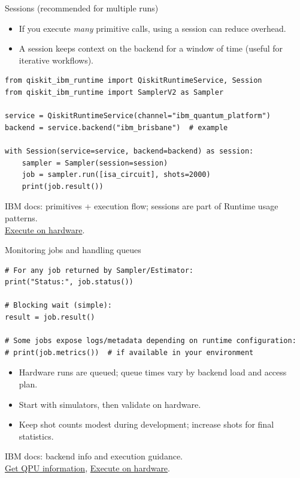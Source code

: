 \documentclass{beamer}
\begin{document}
\begin{frame}[fragile]{Sessions (recommended for multiple runs)}
\begin{itemize}
  \item If you execute \emph{many} primitive calls, using a session can reduce overhead.
  \item A session keeps context on the backend for a window of time (useful for iterative workflows).
\end{itemize}

\begin{lstlisting}
from qiskit_ibm_runtime import QiskitRuntimeService, Session
from qiskit_ibm_runtime import SamplerV2 as Sampler

service = QiskitRuntimeService(channel="ibm_quantum_platform")
backend = service.backend("ibm_brisbane")  # example

with Session(service=service, backend=backend) as session:
    sampler = Sampler(session=session)
    job = sampler.run([isa_circuit], shots=2000)
    print(job.result())
\end{lstlisting}

\vspace{0.2em}
\scriptsize
IBM docs: primitives + execution flow; sessions are part of Runtime usage patterns.\\
\href{https://quantum.cloud.ibm.com/docs/guides/execute-on-hardware}{Execute on hardware}.%
\end{frame}

\begin{frame}[fragile]{Monitoring jobs and handling queues}
\begin{lstlisting}
# For any job returned by Sampler/Estimator:
print("Status:", job.status())

# Blocking wait (simple):
result = job.result()

# Some jobs expose logs/metadata depending on runtime configuration:
# print(job.metrics())  # if available in your environment
\end{lstlisting}

\begin{itemize}
  \item Hardware runs are queued; queue times vary by backend load and access plan.
  \item Start with simulators, then validate on hardware.
  \item Keep shot counts modest during development; increase shots for final statistics.
\end{itemize}

\vspace{0.2em}
\scriptsize
IBM docs: backend info and execution guidance.\\
\href{https://quantum.cloud.ibm.com/docs/guides/get-qpu-information}{Get QPU information},
\href{https://quantum.cloud.ibm.com/docs/guides/execute-on-hardware}{Execute on hardware}.%
\end{frame}
\end{document}
